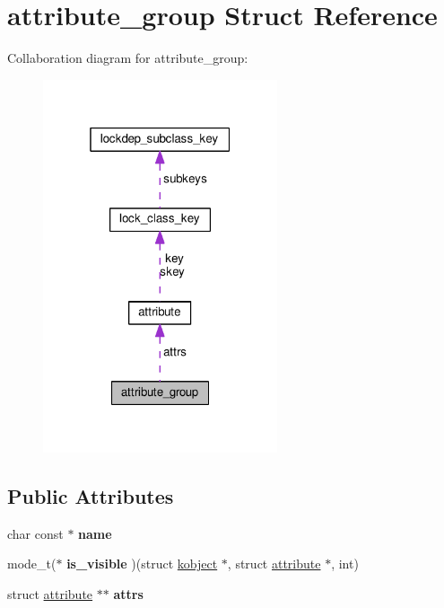 \hypertarget{structattribute__group}{}\section{attribute\+\_\+group Struct Reference}
\label{structattribute__group}


Collaboration diagram for attribute\+\_\+group\+:
\nopagebreak
\begin{figure}[H]
\begin{center}
\leavevmode
\includegraphics[width=196pt]{structattribute__group__coll__graph}
\end{center}
\end{figure}
\subsection*{Public Attributes}
\begin{DoxyCompactItemize}
\item 
\hypertarget{structattribute__group_a0d96fac1b3e1e7c05fd71c57da52fa99}{}char const $\ast$ {\bfseries name}\label{structattribute__group_a0d96fac1b3e1e7c05fd71c57da52fa99}

\item 
\hypertarget{structattribute__group_ade2aff95df02fb4e6bf744f262eb1907}{}mode\+\_\+t($\ast$ {\bfseries is\+\_\+visible} )(struct \hyperlink{structkobject}{kobject} $\ast$, struct \hyperlink{structattribute}{attribute} $\ast$, int)\label{structattribute__group_ade2aff95df02fb4e6bf744f262eb1907}

\item 
\hypertarget{structattribute__group_ac4f0b48813dae2e566c4192b869dfbc5}{}struct \hyperlink{structattribute}{attribute} $\ast$$\ast$ {\bfseries attrs}\label{structattribute__group_ac4f0b48813dae2e566c4192b869dfbc5}

\end{DoxyCompactItemize}


